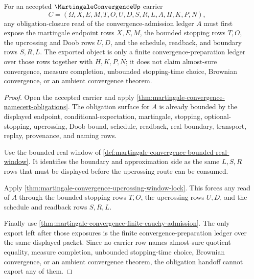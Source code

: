 \begin{theorem}
\label{thm:martingale-convergence-obligation-closure-handoff}
For an accepted $\MartingaleConvergenceUp$ carrier
$$
C=(\Omega,X,E,M,T,O,U,D,S,R,L,A,H,K,P,N),
$$
any obligation-closure read of the convergence-admission ledger $A$ must first expose the martingale endpoint rows $X,E,M$, the bounded stopping rows $T,O$, the upcrossing and Doob rows $U,D$, and the schedule, readback, and boundary rows $S,R,L$. The exported object is only a finite convergence-preparation ledger over those rows together with $H,K,P,N$; it does not claim almost-sure convergence, measure completion, unbounded stopping-time choice, Brownian convergence, or an ambient convergence theorem.
\end{theorem}
\begin{proof}
Open the accepted carrier and apply \autoref{thm:martingale-convergence-namecert-obligations}. The obligation surface for $A$ is already bounded by the displayed endpoint, conditional-expectation, martingale, stopping, optional-stopping, upcrossing, Doob-bound, schedule, readback, real-boundary, transport, replay, provenance, and naming rows.

Use the bounded real window of \autoref{def:martingale-convergence-bounded-real-window}. It identifies the boundary and approximation side as the same $L,S,R$ rows that must be displayed before the upcrossing route can be consumed.

Apply \autoref{thm:martingale-convergence-upcrossing-window-lock}. This forces any read of $A$ through the bounded stopping rows $T,O$, the upcrossing rows $U,D$, and the schedule and readback rows $S,R,L$.

Finally use \autoref{thm:martingale-convergence-finite-cauchy-admission}. The only export left after those exposures is the finite convergence-preparation ledger over the same displayed packet. Since no carrier row names almost-sure quotient equality, measure completion, unbounded stopping-time choice, Brownian convergence, or an ambient convergence theorem, the obligation handoff cannot export any of them.
\end{proof}


